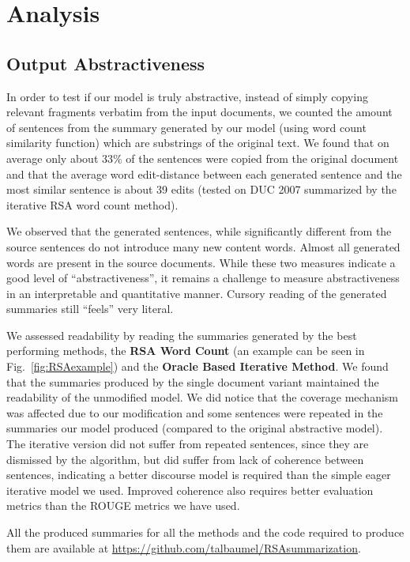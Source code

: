 \documentclass[11pt,a4paper]{article}
\begin{document}
\section{Analysis}

\subsection{Output Abstractiveness}
In order to test if our model is truly abstractive, instead of simply copying relevant fragments verbatim from the input documents, we counted the amount of sentences from the summary generated by our model (using word count similarity function) which are substrings of the original text. We found that on average only about 33\% of the sentences were copied from the original document and that the average word edit-distance between each generated sentence and the most similar sentence is about 39 edits (tested on DUC 2007 summarized by the iterative RSA word count method). 

We observed that the generated sentences, while significantly different from the source sentences do not introduce many new content words.  Almost all generated words are  present in the source documents.
While these two measures indicate a good level of ``abstractiveness'', it remains a challenge to measure abstractiveness in an interpretable and quantitative manner.  Cursory reading of the generated summaries still ``feels'' very literal.  
 
We assessed readability by reading the summaries generated by the best performing methods, the \textbf{RSA Word Count} (an example can be seen in Fig.~\ref{fig:RSAexample}) and the \textbf{Oracle Based Iterative Method}. We found that the summaries produced by the single document variant maintained the readability of the unmodified model. We did notice that the coverage mechanism was affected due to our modification and some sentences were repeated in the summaries our model produced (compared to the original abstractive model). The iterative version did not suffer from repeated sentences, since they are dismissed by the algorithm, but did suffer from lack of coherence between sentences, indicating a better discourse model is required than the simple eager iterative model we used.  Improved coherence also requires better evaluation metrics than the ROUGE metrics we have used.

All the produced summaries for all the methods and the code required to produce them are available at \url{https://github.com/talbaumel/RSAsummarization}.
\end{document}
